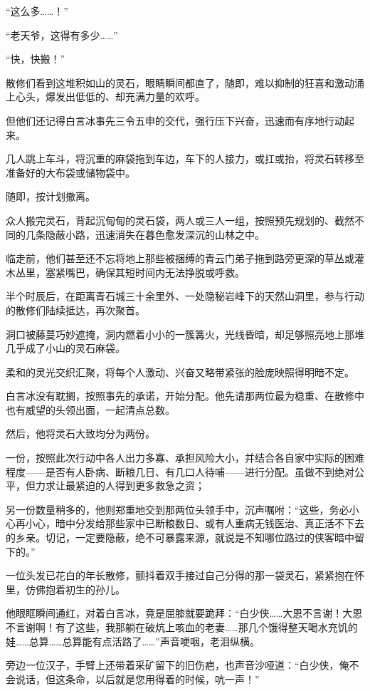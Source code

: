 “这么多……！”

“老天爷，这得有多少……”

“快，快搬！”

散修们看到这堆积如山的灵石，眼睛瞬间都直了，随即，难以抑制的狂喜和激动涌上心头，爆发出低低的、却充满力量的欢呼。

但他们还记得白言冰事先三令五申的交代，强行压下兴奋，迅速而有序地行动起来。

几人跳上车斗，将沉重的麻袋拖到车边，车下的人接力，或扛或抬，将灵石转移至准备好的大布袋或储物袋中。

随即，按计划撤离。

众人搬完灵石，背起沉甸甸的灵石袋，两人或三人一组，按照预先规划的、截然不同的几条隐蔽小路，迅速消失在暮色愈发深沉的山林之中。

临走前，他们甚至还不忘将地上那些被捆缚的青云门弟子拖到路旁更深的草丛或灌木丛里，塞紧嘴巴，确保其短时间内无法挣脱或呼救。

半个时辰后，在距离青石城三十余里外、一处隐秘岩峰下的天然山洞里，参与行动的散修们陆续抵达，再次聚首。

洞口被藤蔓巧妙遮掩，洞内燃着小小的一簇篝火，光线昏暗，却足够照亮地上那堆几乎成了小山的灵石麻袋。

柔和的灵光交织汇聚，将每个人激动、兴奋又略带紧张的脸庞映照得明暗不定。

白言冰没有耽搁，按照事先的承诺，开始分配。他先请那两位最为稳重、在散修中也有威望的头领出面，一起清点总数。

然后，他将灵石大致均分为两份。

一份，按照此次行动中各人出力多寡、承担风险大小，并结合各自家中实际的困难程度——是否有人卧病、断粮几日、有几口人待哺——进行分配。虽做不到绝对公平，但力求让最紧迫的人得到更多救急之资；

另一份数量稍多的，他则郑重地交到那两位头领手中，沉声嘱咐：“这些，务必小心再小心，暗中分发给那些家中已断粮数日、或有人重病无钱医治、真正活不下去的乡亲。切记，一定要隐蔽，绝不可暴露来源，就说是不知哪位路过的侠客暗中留下的。”

一位头发已花白的年长散修，颤抖着双手接过自己分得的那一袋灵石，紧紧抱在怀里，仿佛抱着初生的孙儿。

他眼眶瞬间通红，对着白言冰，竟是屈膝就要跪拜：“白少侠……大恩不言谢！大恩不言谢啊！有了这些，我那躺在破炕上咳血的老妻……那几个饿得整天喝水充饥的娃……总算……总算能有点活路了……”声音哽咽，老泪纵横。

旁边一位汉子，手臂上还带着采矿留下的旧伤疤，也声音沙哑道：“白少侠，俺不会说话，但这条命，以后就是您用得着的时候，吭一声！”

